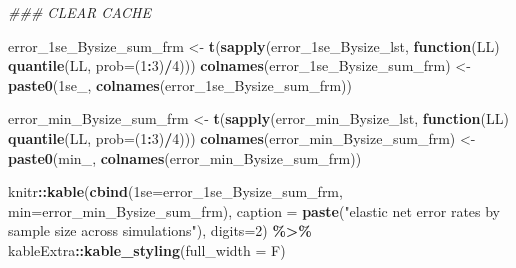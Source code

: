 \documentclass[
]{book}
\newenvironment{Shaded}{\begin{snugshade}}{\end{snugshade}}
\newcommand{\CommentTok}[1]{\textcolor[rgb]{0.56,0.35,0.01}{\textit{#1}}}
\newcommand{\ControlFlowTok}[1]{\textcolor[rgb]{0.13,0.29,0.53}{\textbf{#1}}}
\newcommand{\DataTypeTok}[1]{\textcolor[rgb]{0.13,0.29,0.53}{#1}}
\newcommand{\DecValTok}[1]{\textcolor[rgb]{0.00,0.00,0.81}{#1}}
\newcommand{\KeywordTok}[1]{\textcolor[rgb]{0.13,0.29,0.53}{\textbf{#1}}}
\newcommand{\NormalTok}[1]{#1}
\newcommand{\OperatorTok}[1]{\textcolor[rgb]{0.81,0.36,0.00}{\textbf{#1}}}
\newcommand{\StringTok}[1]{\textcolor[rgb]{0.31,0.60,0.02}{#1}}
\begin{document}
\begin{Shaded}
\begin{Highlighting}[]
\CommentTok{\#\#\# CLEAR CACHE}

\NormalTok{error\_1se\_Bysize\_sum\_frm <{-}}\StringTok{ }\KeywordTok{t}\NormalTok{(}\KeywordTok{sapply}\NormalTok{(error\_1se\_Bysize\_lst, }\ControlFlowTok{function}\NormalTok{(LL) }\KeywordTok{quantile}\NormalTok{(LL, }\DataTypeTok{prob=}\NormalTok{(}\DecValTok{1}\OperatorTok{:}\DecValTok{3}\NormalTok{)}\OperatorTok{/}\DecValTok{4}\NormalTok{)))}
\KeywordTok{colnames}\NormalTok{(error\_1se\_Bysize\_sum\_frm) <{-}}\StringTok{ }\KeywordTok{paste0}\NormalTok{(}\StringTok{\textquotesingle{}1se\_\textquotesingle{}}\NormalTok{, }\KeywordTok{colnames}\NormalTok{(error\_1se\_Bysize\_sum\_frm))}


\NormalTok{error\_min\_Bysize\_sum\_frm <{-}}\StringTok{ }\KeywordTok{t}\NormalTok{(}\KeywordTok{sapply}\NormalTok{(error\_min\_Bysize\_lst, }\ControlFlowTok{function}\NormalTok{(LL) }\KeywordTok{quantile}\NormalTok{(LL, }\DataTypeTok{prob=}\NormalTok{(}\DecValTok{1}\OperatorTok{:}\DecValTok{3}\NormalTok{)}\OperatorTok{/}\DecValTok{4}\NormalTok{)))}
\KeywordTok{colnames}\NormalTok{(error\_min\_Bysize\_sum\_frm) <{-}}\StringTok{ }\KeywordTok{paste0}\NormalTok{(}\StringTok{\textquotesingle{}min\_\textquotesingle{}}\NormalTok{, }\KeywordTok{colnames}\NormalTok{(error\_min\_Bysize\_sum\_frm))}


\NormalTok{knitr}\OperatorTok{::}\KeywordTok{kable}\NormalTok{(}\KeywordTok{cbind}\NormalTok{(}\StringTok{\textasciigrave{}}\DataTypeTok{1se}\StringTok{\textasciigrave{}}\NormalTok{=error\_1se\_Bysize\_sum\_frm, }\DataTypeTok{min=}\NormalTok{error\_min\_Bysize\_sum\_frm),}
      \DataTypeTok{caption =} \KeywordTok{paste}\NormalTok{(}\StringTok{"elastic net error rates by sample size across simulations"}\NormalTok{),}
    \DataTypeTok{digits=}\DecValTok{2}\NormalTok{) }\OperatorTok{\%>\%}
\StringTok{   }\NormalTok{kableExtra}\OperatorTok{::}\KeywordTok{kable\_styling}\NormalTok{(}\DataTypeTok{full\_width =}\NormalTok{ F)}
\end{Highlighting}
\end{Shaded}
\end{document}
